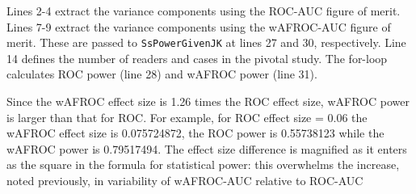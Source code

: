\documentclass[
]{book}
\newenvironment{Shaded}{\begin{snugshade}}{\end{snugshade}}
\newcommand{\AttributeTok}[1]{\textcolor[rgb]{0.77,0.63,0.00}{#1}}
\newcommand{\CommentTok}[1]{\textcolor[rgb]{0.56,0.35,0.01}{\textit{#1}}}
\newcommand{\ConstantTok}[1]{\textcolor[rgb]{0.00,0.00,0.00}{#1}}
\newcommand{\FunctionTok}[1]{\textcolor[rgb]{0.00,0.00,0.00}{#1}}
\newcommand{\NormalTok}[1]{#1}
\newcommand{\OtherTok}[1]{\textcolor[rgb]{0.56,0.35,0.01}{#1}}
\newcommand{\SpecialCharTok}[1]{\textcolor[rgb]{0.00,0.00,0.00}{#1}}
\newcommand{\StringTok}[1]{\textcolor[rgb]{0.31,0.60,0.02}{#1}}
\begin{document}
\begin{Shaded}
\end{Shaded}

Lines 2-4 extract the variance components using the ROC-AUC figure of merit. Lines 7-9 extract the variance components using the wAFROC-AUC figure of merit. These are passed to \texttt{SsPowerGivenJK} at lines 27 and 30, respectively. Line 14 defines the number of readers and cases in the pivotal study. The for-loop calculates ROC power (line 28) and wAFROC power (line 31).

Since the wAFROC effect size is 1.26 times the ROC effect size, wAFROC power is larger than that for ROC. For example, for ROC effect size = 0.06 the wAFROC effect size is 0.075724872, the ROC power is 0.55738123 while the wAFROC power is 0.79517494. The effect size difference is magnified as it enters as the square in the formula for statistical power: this overwhelms the increase, noted previously, in variability of wAFROC-AUC relative to ROC-AUC
\end{document}
